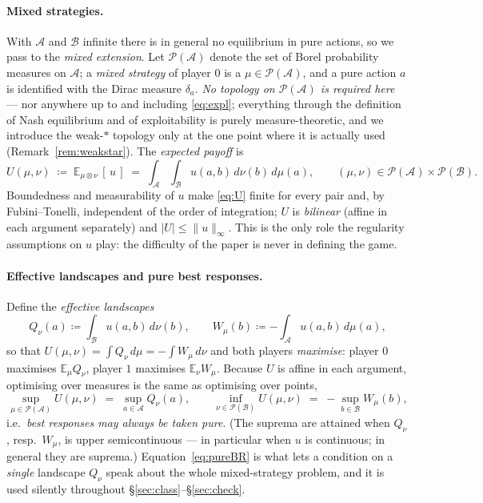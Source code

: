 \documentclass[11pt]{article}
\theoremstyle{definition}
\theoremstyle{remark}
\newcommand{\E}{\mathbb{E}}
\newcommand{\cA}{\mathcal{A}}
\newcommand{\cB}{\mathcal{B}}
\newcommand{\cP}{\mathcal{P}}
\begin{document}
\paragraph{Mixed strategies.}
With $\cA$ and $\cB$ infinite there is in general no equilibrium in pure
actions, so we pass to the \emph{mixed extension}. Let $\cP(\cA)$ denote the set
of Borel probability measures on $\cA$; a \emph{mixed strategy} of player $0$ is
a $\mu \in \cP(\cA)$, and a pure action $a$ is identified with the Dirac measure
$\delta_a$. \emph{No topology on $\cP(\cA)$ is required here} --- nor anywhere up
to and including \eqref{eq:expl}; everything through the definition of Nash
equilibrium and of exploitability is purely measure-theoretic, and we introduce
the weak-$*$ topology only at the one point where it is actually used
(Remark~\ref{rem:weakstar}). The \emph{expected payoff} is
\begin{equation}\label{eq:U}
  U(\mu,\nu) \;\coloneqq\; \E_{\mu \otimes \nu}\,[\,u\,]
  \;=\; \int_\cA\!\!\int_\cB u(a,b)\,d\nu(b)\,d\mu(a),
  \qquad (\mu,\nu) \in \cP(\cA) \times \cP(\cB).
\end{equation}
Boundedness and measurability of $u$ make \eqref{eq:U} finite for every pair and,
by Fubini--Tonelli, independent of the order of integration; $U$ is
\emph{bilinear} (affine in each argument separately) and $|U| \le \|u\|_\infty$.
This is the only role the regularity assumptions on $u$ play: the difficulty of
the paper is never in defining the game.

\paragraph{Effective landscapes and pure best responses.}
Define the \emph{effective landscapes}
\begin{equation}\label{eq:eff}
  Q_\nu(a) \coloneqq \int_\cB u(a,b)\,d\nu(b),
  \qquad
  W_\mu(b) \coloneqq -\int_\cA u(a,b)\,d\mu(a),
\end{equation}
so that $U(\mu,\nu) = \int Q_\nu \,d\mu = -\int W_\mu \,d\nu$ and both players
\emph{maximise}: player $0$ maximises $\E_\mu Q_\nu$, player $1$ maximises
$\E_\nu W_\mu$. Because $U$ is affine in each argument, optimising over measures
is the same as optimising over points,
\begin{equation}\label{eq:pureBR}
  \sup_{\mu \in \cP(\cA)} U(\mu,\nu) \;=\; \sup_{a \in \cA} Q_\nu(a),
  \qquad
  \inf_{\nu \in \cP(\cB)} U(\mu,\nu) \;=\; -\sup_{b \in \cB} W_\mu(b),
\end{equation}
i.e.\ \emph{best responses may always be taken pure}. (The suprema are attained
when $Q_\nu$, resp.\ $W_\mu$, is upper semicontinuous --- in particular when $u$
is continuous; in general they are suprema.) Equation~\eqref{eq:pureBR} is what
lets a condition on a \emph{single} landscape $Q_\nu$ speak about the whole
mixed-strategy problem, and it is used silently throughout
\S\ref{sec:class}--\S\ref{sec:check}.
\end{document}
